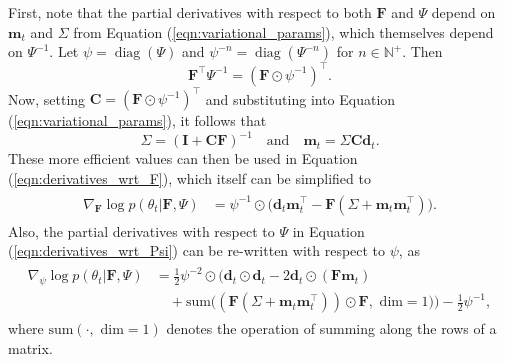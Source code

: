 \documentclass[msc,deptreport.inf]{infthesis} %
\newcommand{\matr}[1]{\mathbf{#1}}
\newcommand{\N}{\mathbb N}
\newcommand{\diag}{\mathop{\mathrm{diag}}}
\begin{document}
First, note that the partial derivatives with respect to both $\matr{F}$ and $\Psi$ depend on $\matr{m}_t$ and $\Sigma$ from Equation (\ref{eqn:variational_params}), which themselves depend on  $\Psi^{-1}$. Let $\psi = \diag(\Psi)$ and $\psi^{-n} = \diag(\Psi^{-n})$ for $n \in \N^+$. Then 
\begin{equation}
	\matr{F}^\intercal \Psi^{-1} = (\matr{F} \odot \psi^{-1})^\intercal.
\end{equation}
Now, setting $\matr{C} =  (\matr{F} \odot \psi^{-1})^\intercal$ and substituting into Equation (\ref{eqn:variational_params}), it follows that 
\begin{equation}\label{eqn:efficient_m_and_sigma}
	\Sigma = (\matr{I} + \matr{C} \matr{F})^{-1} \quad \text{and} \quad \matr{m}_t = \Sigma \matr{C} \matr{d}_t.
\end{equation}
These more efficient values can then be used in Equation (\ref{eqn:derivatives_wrt_F}), which itself can be simplified to 
\begin{align}\label{eqn:efficient_derivatives_wrt_F}
\begin{split}
	\nabla_{\matr{F}} \log p(\theta_t | \matr{F}, \Psi) 
	& = \psi^{-1} \odot \big(\matr{d}_t \matr{m}_t^\intercal  - \matr{F}  (\Sigma + \matr{m}_t \matr{m}_t^\intercal) \big).
\end{split}
\end{align} 
Also, the partial derivatives with respect to $\Psi$ in Equation (\ref{eqn:derivatives_wrt_Psi}) can be re-written with respect to $\psi$, as 
\begin{align}
\begin{split}\label{eqn:efficient_derivatives_wrt_Psi}
	\nabla_{\psi} \log p(\theta_t | \matr{F}, \Psi) 
	& = \frac{1}{2} \psi^{-2} \odot \Big(\matr{d}_t \odot \matr{d}_t - 2\matr{d}_t \odot (\matr{F} \matr{m}_t) \\
	& \quad + \text{sum}\big((\matr{F} (\Sigma + \matr{m}_t \matr{m}_t^\intercal)) \odot \matr{F}, \text{ dim} = 1\big) \Big)
	 - \frac{1}{2} \psi^{-1},
\end{split}
\end{align} 
where $\text{sum}(\cdot, \text{ dim} = 1)$ denotes the operation of summing along the rows of a matrix. 
\end{document}
